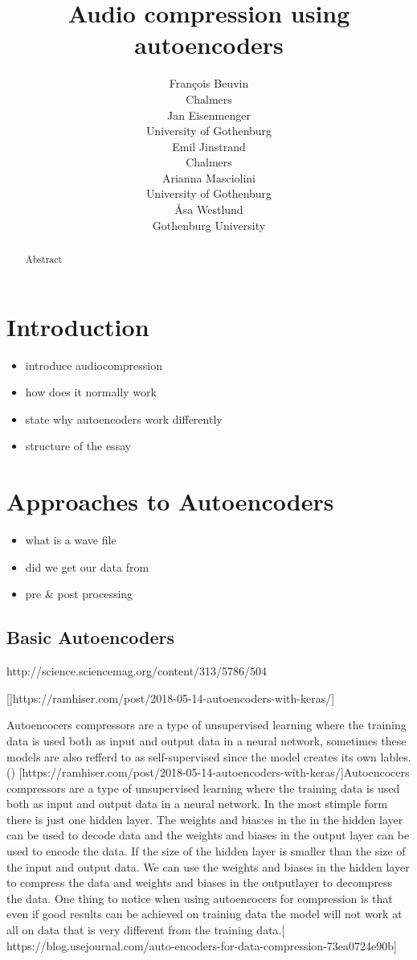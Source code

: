 \documentclass[11pt]{article}
\title{Audio compression using autoencoders}
\author{Fran\c{c}ois Beuvin \\
  Chalmers \\
  \And
  Jan Eisenmenger \\
  University of Gothenburg \\
  \And
  Emil Jinstrand \\
  Chalmers \\
  \AND
  Arianna Masciolini \\
  University of Gothenburg\\
  \And
  \r{A}sa Westlund \\
  Gothenburg University\\}
\date{}
\begin{document}
\maketitle
\begin{abstract}
Abstract
\end{abstract}

\nocite{*}



\section{Introduction}
\begin{itemize}
    \item introduce audiocompression
    \item how does it normally work
    \item state why autoencoders work differently
    \item structure of the essay
\end{itemize}

\section{Approaches to Autoencoders}
\begin{itemize}
    \item what is a wave file
    \item did we get our data from
    \item pre & post processing
\end{itemize}
    	
   
\subsection{Basic Autoencoders}
http://science.sciencemag.org/content/313/5786/504

[]https://ramhiser.com/post/2018-05-14-autoencoders-with-keras/]

Autoencocers compressors are a type of unsupervised learning where the training data is used both as input and output data in a neural network, sometimes these models are also refferd to as self-supervised since the model creates its own lables. (\cite{Hinton.2006}) [https://ramhiser.com/post/2018-05-14-autoencoders-with-keras/]Autoencocers compressors are a type of unsupervised learning where the training data is used both as input and output data in a neural network. In the most stimple form there is just one hidden layer. The weights and bias:es in the in the hidden layer can be used to decode data and the weights and biases in the output layer can be used to encode the data. If the size of the hidden layer is smaller than the size of the input and output data. We can use the weights and biases in the hidden layer to compress the data and weights and biases in the outputlayer to decompress the data. 
One thing to notice when using autoencocers for compression is that even if good results can be achieved on training data the model will not work at all on data that is very different from the training data.[ https://blog.usejournal.com/auto-encoders-for-data-compression-73ea0724e90b] 
\end{document}
